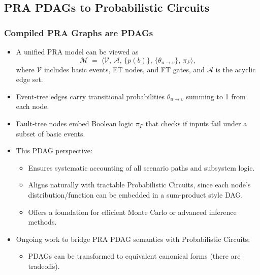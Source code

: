 \subsection{PRA PDAGs to Probabilistic Circuits}
\begin{frame}[allowframebreaks]
\frametitle{Compiled PRA Graphs are PDAGs}
\begin{itemize}
  \item A unified PRA model can be viewed as
    \[
      \mathcal{M} 
      \;=\;
      \langle 
        \mathcal{V},\,\mathcal{A},\, \{p(b)\},\, \{\theta_{u\to v}\},\,\pi_{F}
      \rangle,
    \]
    where \(\mathcal{V}\) includes basic events, ET nodes, and FT gates, and \(\mathcal{A}\) is the acyclic edge set.
  \item Event-tree edges carry transitional probabilities \(\theta_{u\to v}\) summing to 1 from each node.
  \item Fault-tree nodes embed Boolean logic \(\pi_F\) that checks if inputs fail under a subset of basic events.
  \framebreak
  \item This PDAG perspective:
    \begin{itemize}
      \item Ensures systematic accounting of all scenario paths and subsystem logic.
      \item Aligns naturally with tractable Probabilistic Circuits, since each node’s distribution/function can be embedded in a sum-product style DAG.
      \item Offers a foundation for efficient Monte Carlo or advanced inference methods.
    \end{itemize}
    \vspace{6pt}
    \item Ongoing work to bridge PRA PDAG semantics with Probabilistic Circuits:
    \begin{itemize}
      \item PDAGs can be transformed to equivalent canonical forms (there are tradeoffs).
    \end{itemize}
\end{itemize}
\end{frame}